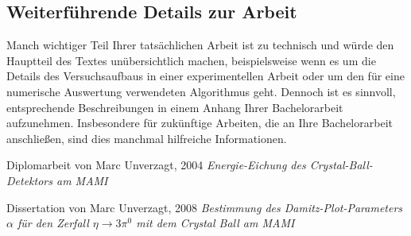 \documentclass[a4paper,11pt,oneside,final,german,openbib,pdftex]{scrbook}
\begin{document}
{\begin{appendix}
\section{Weiterf\"uhrende Details zur Arbeit}

Manch wichtiger Teil Ihrer tats\"achlichen Arbeit ist zu technisch 
und w\"urde den Hauptteil des Textes un\"ubersichtlich machen, 
beispielsweise wenn es um die Details des Versuchsaufbaus in einer 
experimentellen Arbeit oder um den f\"ur eine numerische Auswertung 
verwendeten Algorithmus geht. Dennoch ist es sinnvoll, entsprechende 
Beschreibungen in einem Anhang Ihrer Bachelorarbeit aufzunehmen. 
Insbesondere f\"ur zuk\"unftige Arbeiten, die an Ihre Bachelorarbeit 
anschlie{\ss}en, sind dies manchmal hilfreiche Informationen.





\renewcommand{\bibname}{\bfont Literaturverzeichnis} 

\begin{thebibliography}{99}
	
 Diplomarbeit von Marc Unverzagt, 2004 {\em Energie-Eichung des Crystal-Ball-Detektors am MAMI}

 Dissertation von Marc Unverzagt, 2008 {\em Bestimmung des Damitz-Plot-Parameters $\alpha$ für den Zerfall $ \eta \rightarrow 3\pi^{0} $ mit dem Crystal Ball am MAMI}


\end{thebibliography}
\end{appendix}}
\end{document}
